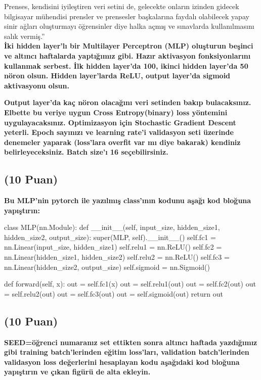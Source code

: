 \documentclass[11pt]{article}
\begin{document}
Prenses, kendisini iyileştiren veri setini de, gelecekte onların izinden gidecek bilgisayar mühendisi prensler ve prensesler başkalarına faydalı olabilecek yapay sinir ağları oluşturmayı öğrensinler diye halka açmış ve sınavlarda kullanılmasını salık vermiş.''\\

\textbf{İki hidden layer'lı bir Multilayer Perceptron (MLP) oluşturun beşinci ve altıncı haftalarda yaptığımız gibi. Hazır aktivasyon fonksiyonlarını kullanmak serbest. İlk hidden layer'da 100, ikinci hidden layer'da 50 nöron olsun. Hidden layer'larda ReLU, output layer'da sigmoid aktivasyonu olsun.}

\textbf{Output layer'da kaç nöron olacağını veri setinden bakıp bulacaksınız. Elbette bu veriye uygun Cross Entropy(binary) loss yöntemini uygulayacaksınız. Optimizasyon için Stochastic Gradient Descent yeterli. Epoch sayınızı ve learning rate'i validasyon seti üzerinde denemeler yaparak (loss'lara overfit var mı diye bakarak) kendiniz belirleyeceksiniz. Batch size'ı 16 seçebilirsiniz.}

\subsection{(10 Puan)} \textbf{Bu MLP'nin pytorch ile yazılmış class'ının kodunu aşağı kod bloğuna yapıştırın:}

\begin{python}
class MLP(nn.Module):
    def __init__(self, input_size, hidden_size1, hidden_size2, output_size):
        super(MLP, self).__init__()
        self.fc1 = nn.Linear(input_size, hidden_size1)
        self.relu1 = nn.ReLU()
        self.fc2 = nn.Linear(hidden_size1, hidden_size2)
        self.relu2 = nn.ReLU()
        self.fc3 = nn.Linear(hidden_size2, output_size)
        self.sigmoid = nn.Sigmoid()
        
    def forward(self, x):
        out = self.fc1(x)
        out = self.relu1(out)
        out = self.fc2(out)
        out = self.relu2(out)
        out = self.fc3(out)
        out = self.sigmoid(out)
        return out

\end{python}

\subsection{(10 Puan)} \textbf{SEED=öğrenci numaranız set ettikten sonra altıncı haftada yazdığımız gibi training batch'lerinden eğitim loss'ları, validation batch'lerinden validasyon loss değerlerini hesaplayan kodu aşağıdaki kod bloğuna yapıştırın ve çıkan figürü de alta ekleyin.}
\end{document}
